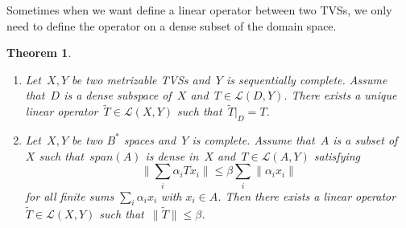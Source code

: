 \documentclass[12pt,a4paper,draft]{article}  %
\newtheorem{theorem}{Theorem}[section]
\theoremstyle{definition}
\numberwithin{equation}{section}
\begin{document}
Sometimes when we want define a linear operator between two TVSs, we only need to define the operator on a dense subset of the domain space.
\begin{theorem}
    \begin{enumerate}
        \item Let~$X,Y$ be two metrizable TVSs and~$Y$ is sequentially complete.
        Assume that~$D$ is a dense subspace of~$X$ and~$T \in \mathcal{L}(D,Y)$.
        There exists a unique linear operator~$\tilde{T} \in \mathcal{L}(X,Y)$ such that~$\tilde{T}|_D = T$.
        \item Let~$X,Y$ be two $B^*$ spaces and~$Y$ is complete.
        Assume that~$A$ is a subset of~$X$ such that~$span(A)$ is dense in~$X$ and~$T \in \mathcal{L}(A,Y)$ satisfying
        $$ \|\sum_{i}\alpha_i Tx_i\| \leq \beta \sum_{i}\|\alpha_i x_i\| $$
        for all finite sums $\sum_{i}\alpha_i x_i$ with $x_i \in A$.
        Then there exists a linear operator~$\tilde{T} \in \mathcal{L}(X,Y)$ such that~$\|\tilde{T}\| \leq \beta$.
    \end{enumerate}
\end{theorem}
\end{document}
